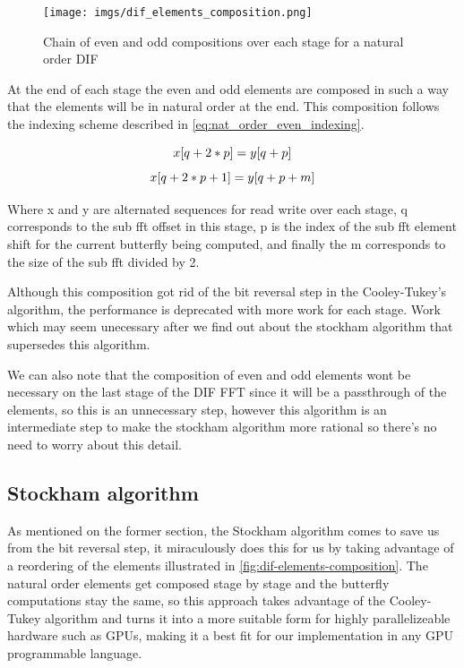 \documentclass[
  oneside,
  11pt, a4paper,
  footinclude=true,
  headinclude=true,
  cleardoublepage=empty
]{scrbook}
\begin{document}
\begin{figure}[h] 
    \centering
    \texttt{[image: imgs/dif\_elements\_composition.png]}
    \caption{Chain of even and odd compositions over each stage for a natural order DIF}
    \label{fig:dif-elements-composition}
\end{figure}

At the end of each stage the even and odd elements are composed in such a way that the elements will be in natural order at the end. This composition follows the indexing scheme described in \autoref{eq:nat_order_even_indexing}.

\begin{equation} \label{eq:nat_order_even_indexing}
    x[q + 2*p] = y[q + p] \\
\end{equation}
\begin{equation} \label{eq:nat_order_odd_indexing}
    x[q + 2*p + 1] = y[q + p + m] \\
\end{equation}

Where x and y are alternated sequences for read write over each stage, q corresponds to the sub fft offset in this stage, p is the index of the sub fft element shift for the current butterfly being computed, and finally the m corresponds to the size of the sub fft divided by 2.

Although this composition got rid of the bit reversal step in the Cooley-Tukey's algorithm, the performance is deprecated with more work for each stage. Work which may seem unecessary after we find out about the stockham algorithm that supersedes this algorithm.

We can also note that the composition of even and odd elements wont be necessary on the last stage of the DIF FFT since it will be a passthrough of the elements, so this is an unnecessary step, however this algorithm is an intermediate step to make the stockham algorithm more rational so there's no need to worry about this detail.



\subsection{Stockham algorithm} \label{subsec:stockham-algorithm}

As mentioned on the former section, the Stockham algorithm comes to save us from the bit reversal step, it miraculously does this for us by taking advantage of a reordering of the elements \cite{govindaraju2008high} illustrated in \autoref{fig:dif-elements-composition}. The natural order elements get composed stage by stage and the butterfly computations stay the same, so this approach takes advantage of the Cooley-Tukey algorithm and turns it into a more suitable form for highly parallelizeable hardware such as GPUs, making it a best fit for our implementation in any GPU programmable language. \newline
\end{document}
